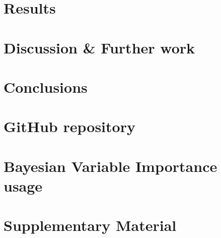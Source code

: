 \documentclass[a4paper, 12pt, openany]{book} %
\begin{document}
\chapter{Results}
\label{ch:results}

\cleardoublepage

%

%


\chapter{Discussion \& Further work}
\label{ch:discussion}

\cleardoublepage


\chapter{Conclusions}
\label{ch:conclusion}

\cleardoublepage


\cleardoublepage



\appendix
{}
\chapter{GitHub repository}
\label{ap:github-repository}


\chapter{Bayesian Variable Importance usage}
\label{ap:bayesian-importance}


\chapter{Supplementary Material}
\label{ap:supplementary}

\end{document}
